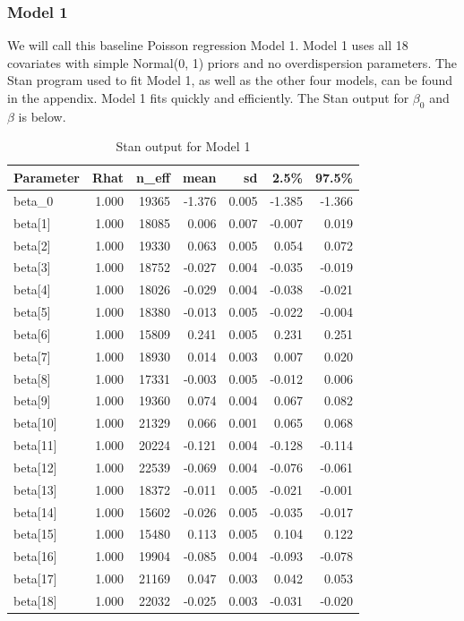 \documentclass[
]{article}
\begin{document}
\hypertarget{model-1}{%
\subsubsection{Model 1}\label{model-1}}

We will call this baseline Poisson regression Model 1. Model 1 uses all
18 covariates with simple Normal(0, 1) priors and no overdispersion
parameters. The Stan program used to fit Model 1, as well as the other
four models, can be found in the appendix. Model 1 fits quickly and
efficiently. The Stan output for \(\beta_0\) and \(\beta\) is below.

\begin{table}[ht]
\centering
\begin{tabular}{lrrrrrr}
  \toprule
Parameter & Rhat & n\_eff & mean & sd & 2.5\% & 97.5\% \\ 
  \midrule
beta\_0 & 1.000 & 19365 & -1.376 & 0.005 & -1.385 & -1.366 \\ 
  beta[1] & 1.000 & 18085 & 0.006 & 0.007 & -0.007 & 0.019 \\ 
  beta[2] & 1.000 & 19330 & 0.063 & 0.005 & 0.054 & 0.072 \\ 
  beta[3] & 1.000 & 18752 & -0.027 & 0.004 & -0.035 & -0.019 \\ 
  beta[4] & 1.000 & 18026 & -0.029 & 0.004 & -0.038 & -0.021 \\ 
  beta[5] & 1.000 & 18380 & -0.013 & 0.005 & -0.022 & -0.004 \\ 
  beta[6] & 1.000 & 15809 & 0.241 & 0.005 & 0.231 & 0.251 \\ 
  beta[7] & 1.000 & 18930 & 0.014 & 0.003 & 0.007 & 0.020 \\ 
  beta[8] & 1.000 & 17331 & -0.003 & 0.005 & -0.012 & 0.006 \\ 
  beta[9] & 1.000 & 19360 & 0.074 & 0.004 & 0.067 & 0.082 \\ 
  beta[10] & 1.000 & 21329 & 0.066 & 0.001 & 0.065 & 0.068 \\ 
  beta[11] & 1.000 & 20224 & -0.121 & 0.004 & -0.128 & -0.114 \\ 
  beta[12] & 1.000 & 22539 & -0.069 & 0.004 & -0.076 & -0.061 \\ 
  beta[13] & 1.000 & 18372 & -0.011 & 0.005 & -0.021 & -0.001 \\ 
  beta[14] & 1.000 & 15602 & -0.026 & 0.005 & -0.035 & -0.017 \\ 
  beta[15] & 1.000 & 15480 & 0.113 & 0.005 & 0.104 & 0.122 \\ 
  beta[16] & 1.000 & 19904 & -0.085 & 0.004 & -0.093 & -0.078 \\ 
  beta[17] & 1.000 & 21169 & 0.047 & 0.003 & 0.042 & 0.053 \\ 
  beta[18] & 1.000 & 22032 & -0.025 & 0.003 & -0.031 & -0.020 \\ 
   \bottomrule
\end{tabular}
\caption{Stan output for Model 1} 
\end{table}
\end{document}

